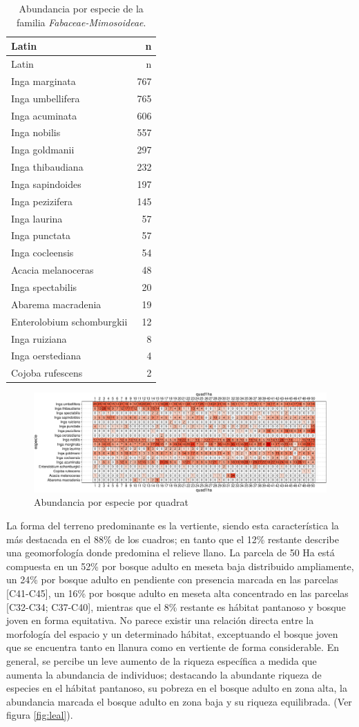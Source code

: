 \documentclass[11pt,]{article}
\begin{document}
\begin{longtable}[]{@{}lr@{}}
\caption{\label{tab:abun_sp}Abundancia por especie de la familia
\emph{Fabaceae-Mimosoideae}.}\tabularnewline
\toprule
Latin & n\tabularnewline
\midrule
\endfirsthead
\toprule
Latin & n\tabularnewline
\midrule
\endhead
Inga marginata & 767\tabularnewline
Inga umbellifera & 765\tabularnewline
Inga acuminata & 606\tabularnewline
Inga nobilis & 557\tabularnewline
Inga goldmanii & 297\tabularnewline
Inga thibaudiana & 232\tabularnewline
Inga sapindoides & 197\tabularnewline
Inga pezizifera & 145\tabularnewline
Inga laurina & 57\tabularnewline
Inga punctata & 57\tabularnewline
Inga cocleensis & 54\tabularnewline
Acacia melanoceras & 48\tabularnewline
Inga spectabilis & 20\tabularnewline
Abarema macradenia & 19\tabularnewline
Enterolobium schomburgkii & 12\tabularnewline
Inga ruiziana & 8\tabularnewline
Inga oerstediana & 4\tabularnewline
Cojoba rufescens & 2\tabularnewline
\bottomrule
\end{longtable}

\begin{figure}
\centering
\includegraphics{manuscrito_files/figure-latex/unnamed-chunk-3-1.pdf}
\caption{\label{fig:abun_sp_q}Abundancia por especie por quadrat}
\end{figure}

La forma del terreno predominante es la vertiente, siendo esta
característica la más destacada en el 88\% de los cuadros; en tanto que
el 12\% restante describe una geomorfología donde predomina el relieve
llano. La parcela de 50 Ha está compuesta en un 52\% por bosque adulto
en meseta baja distribuido ampliamente, un 24\% por bosque adulto en
pendiente con presencia marcada en las parcelas {[}C41-C45{]}, un 16\%
por bosque adulto en meseta alta concentrado en las parcelas {[}C32-C34;
C37-C40{]}, mientras que el 8\% restante es hábitat pantanoso y bosque
joven en forma equitativa. No parece existir una relación directa entre
la morfología del espacio y un determinado hábitat, exceptuando el
bosque joven que se encuentra tanto en llanura como en vertiente de
forma considerable. En general, se percibe un leve aumento de la riqueza
específica a medida que aumenta la abundancia de individuos; destacando
la abundante riqueza de especies en el hábitat pantanoso, su pobreza en
el bosque adulto en zona alta, la abundancia marcada el bosque adulto en
zona baja y su riqueza equilibrada. (Ver figura \ref{fig:leal}).
\end{document}
